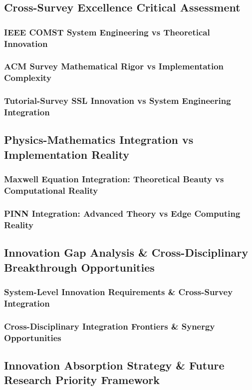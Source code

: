 \documentclass[journal]{IEEEtran}
\begin{document}
\subsection{Cross-Survey Excellence Critical Assessment}
\subsubsection{IEEE COMST System Engineering vs Theoretical Innovation}
\subsubsection{ACM Survey Mathematical Rigor vs Implementation Complexity}
\subsubsection{Tutorial-Survey SSL Innovation vs System Engineering Integration}

\subsection{Physics-Mathematics Integration vs Implementation Reality}
\subsubsection{Maxwell Equation Integration: Theoretical Beauty vs Computational Reality}
\subsubsection{PINN Integration: Advanced Theory vs Edge Computing Reality}

\subsection{Innovation Gap Analysis \& Cross-Disciplinary Breakthrough Opportunities}
\subsubsection{System-Level Innovation Requirements \& Cross-Survey Integration}
\subsubsection{Cross-Disciplinary Integration Frontiers \& Synergy Opportunities}

\subsection{Innovation Absorption Strategy \& Future Research Priority Framework}
\end{document}
